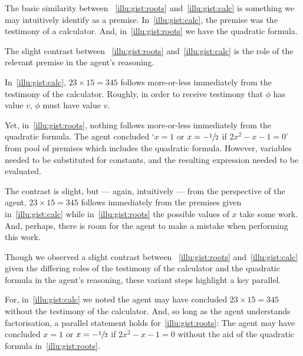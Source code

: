 \begin{note}
  \color{red}
  The basic similarity between ~\ref{illu:gist:roots} and~\ref{illu:gist:calc} is something we may intuitively identify as a premise.
  In~\autoref{illu:gist:calc}, the premise was the testimony of a calculator.
  And, in~\autoref{illu:gist:roots} we have the quadratic formula.

  The slight contrast between ~\ref{illu:gist:roots} and~\ref{illu:gist:calc} is the role of the relevant premise in the agent's reasoning.

  In~\autoref{illu:gist:calc}, \(23 \times 15 = 345\) follows more-or-less immediately from the testimony of the calculator.
  Roughly, in order to receive testimony that \(\phi\) has value \(v\), \(\phi\) must have value \(v\).

  Yet, in~\autoref{illu:gist:roots}, nothing follows more-or-less immediately from the quadratic formula.
  The agent concluded `\(x = 1\) or \(x = -\sfrac{1}{2}\) if \(2x^{2} - x - 1 = 0\)' from pool of premises which includes the quadratic formula.
  However, variables needed to be substituted for constants, and the resulting expression needed to be evaluated.

  The contrast is slight, but --- again, intuitively --- from the perspective of the agent, \(23 \times 15 = 345\) follows immediately from the premises given in~\autoref{illu:gist:calc} while in~\autoref{illu:gist:roots} the possible values of \(x\) take some work.
  And, perhaps, there is room for the agent to make a mistake when performing this work.
\end{note}

\begin{note}
  \color{red}
  Though we observed a slight contrast between ~\ref{illu:gist:roots} and~\ref{illu:gist:calc} given the differing roles of the testimony of the calculator and the quadratic formula in the agent's reasoning, these variant steps highlight a key parallel.

  For, in~\autoref{illu:gist:calc} we noted the agent may have concluded \(23 \times 15 = 345\) without the testimony of the calculator.
  And, so long as the agent understands factorisation, a parallel statement holds for~\ref{illu:gist:roots}:
  The agent may have concluded \(x = 1\) or \(x = -\sfrac{1}{2}\) if \(2x^{2} - x - 1 = 0\) without the aid of the quadratic formula in~\autoref{illu:gist:roots}.
\end{note}

